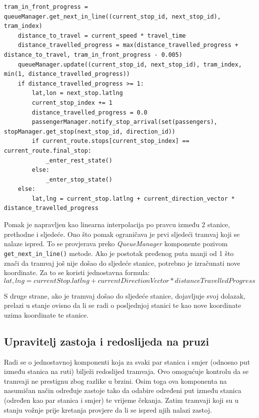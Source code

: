 \documentclass[times, utf8, diplomski]{fer}
\begin{document}
\begin{lstlisting}[caption={Pomak tramvaja},captionpos=b,label={kod:tram_move}]
    tram_in_front_progress = queueManager.get_next_in_line((current_stop_id, next_stop_id), tram_index)
    distance_to_travel = current_speed * travel_time
    distance_travelled_progress = max(distance_travelled_progress + distance_to_travel, tram_in_front_progress - 0.005)
    queueManager.update((current_stop_id, next_stop_id), tram_index, min(1, distance_travelled_progress))
    if distance_travelled_progress >= 1:
        lat,lon = next_stop.latlng
        current_stop_index += 1
        distance_travelled_progress = 0.0
        passengerManager.notify_stop_arrival(set(passengers), stopManager.get_stop(next_stop_id, direction_id))
        if current_route.stops[current_stop_index] == current_route.final_stop:
            _enter_rest_state()
        else:
            _enter_stop_state()
    else:
        lat,lng = current_stop.latlng + current_direction_vector * distance_travelled_progress 
\end{lstlisting}

Pomak je napravljen kao linearna interpolacija po pravcu između 2 stanice, prethodne i sljedeće. Ono što pomak ograničava je prvi sljedeći tramvaj koji se nalaze ispred. To se provjerava preko \emph{QueueManager} komponente pozivom \texttt{get\_next\_in\_line()} metode. Ako je postotak pređenog puta manji od 1 što znači da tramvaj još nije došao do sljedeće stanice, potrebno je izračunati nove koordinate. Za to se koristi jednostavna formula:
\begin{equation} \label{formula:tram_move}
    lat,lng = currentStop.latlng + currentDirectionVector * distanceTravelledProgress
\end{equation}

S druge strane, ako je tramvaj došao do sljedeće stanice, dojavljuje svoj dolazak, prelazi u stanje ovisno da li se radi o posljednjoj stanici te kao nove koordinate uzima koordinate te stanice.

\subsection{Upravitelj zastoja i redoslijeda na pruzi}
Radi se o jednostavnoj komponenti koja za svaki par stanica i smjer (odnosno put između stanica na ruti) bilježi redoslijed tramvaja. Ovo omogućuje kontrolu da se tramvaji ne prestignu zbog razlike u brzini.
Osim toga ova komponenta na nasumičan način određuje zastoje tako da odabire određeni put između stanica (određen kao par stanica i smjer) te vrijeme čekanja. Zatim tramvaji koji su u stanju vožnje prije kretanja provjere da li se ispred njih nalazi zastoj.
\end{document}
